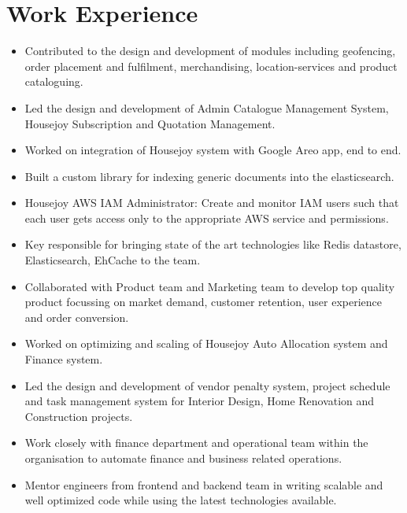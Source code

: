\documentclass[11pt,a4paper,sans]{moderncv}        %
\begin{document}
\section{Work Experience}
\begin{itemize}
	\item Contributed to the design and development of modules including geofencing, order placement and fulfilment, merchandising, location-services and product cataloguing.

	\item Led the design and development  of Admin Catalogue Management System, Housejoy Subscription and Quotation Management. 
	\item Worked on  integration of  Housejoy system with Google Areo app, end to end.
	\item Built a custom library for indexing generic documents into the elasticsearch.
	\item Housejoy AWS IAM Administrator: Create and monitor IAM users such that each user gets access only to the appropriate AWS service and permissions.
	\item Key responsible for bringing state of the art technologies like Redis datastore, Elasticsearch, EhCache to the  team.
	\item Collaborated with  Product team and Marketing team to develop top quality product focussing on market demand, customer retention, user experience and order conversion.
	
\end{itemize}


\begin{itemize}
	\item Worked on optimizing and scaling of Housejoy Auto Allocation system and Finance system.
	\item Led the design and development of vendor penalty system, project schedule and task management system for Interior Design, Home Renovation and Construction projects.
		\item Work closely with finance department and operational team within the organisation to automate finance and business related operations.
	\item Mentor engineers from frontend and backend team in writing scalable and well optimized code while using the latest technologies available.

\end{itemize}
\end{document}
